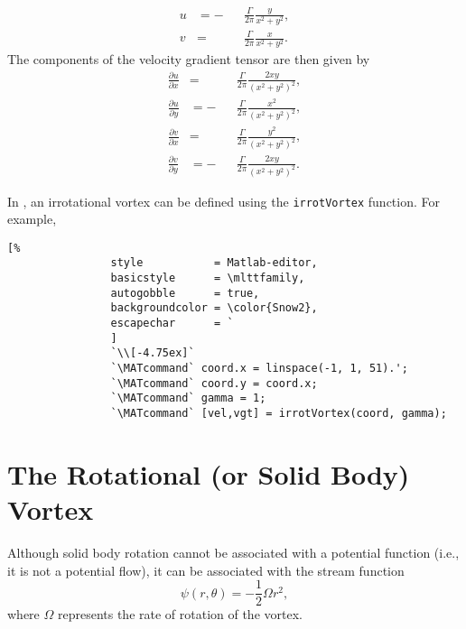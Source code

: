 \documentclass[10pt, twoside]{book}
\begin{document}
			\begin{subequations}
				\label{eq:IrrotVortexVel}
				\begin{alignat}{2}
					u &= -&&\frac{\Gamma}{2\pi}\frac{y}{x^2 + y^2},\label{eq:IrrotVortexVelPolarU}\\
					v &=  &&\frac{\Gamma}{2\pi}\frac{x}{x^2 + y^2}.\label{eq:IrrotVortexVelPolarV}
				\end{alignat}
			\end{subequations}
			The components of the velocity gradient tensor are then given by
			\begin{subequations}
			\label{eq:IrrotVortexVgt}
				\begin{alignat}{2}
					\frac{\partial u}{\partial x} &= &&\frac{\Gamma}{2\pi}\frac{2xy}{\left(x^2 + y^2\right)^2},\label{eq:IrrotVortexVgtUx}\\
					\frac{\partial u}{\partial y} &= -&&\frac{\Gamma}{2\pi}\frac{x^2}{\left(x^2 + y^2\right)^2},\label{eq:IrrotVortexVgtUy}\\
					\frac{\partial v}{\partial x} &= &&\frac{\Gamma}{2\pi}\frac{y^2}{\left(x^2 + y^2\right)^2},\label{eq:IrrotVortexVgtVx}\\
					\frac{\partial v}{\partial y} &= -&&\frac{\Gamma}{2\pi}\frac{2xy}{\left(x^2 + y^2\right)^2}.\label{eq:IrrotVortexVgtVy}
				\end{alignat}
			\end{subequations}
			
			
			In \MATfluids, an irrotational vortex can be defined using the \texttt{irrotVortex} function. For example,
			\begin{lstlisting}[%
				style           = Matlab-editor,
				basicstyle      = \mlttfamily,
				autogobble      = true,
				backgroundcolor = \color{Snow2},
				escapechar      = `
				]
				`\\[-4.75ex]`
				`\MATcommand` coord.x = linspace(-1, 1, 51).';
				`\MATcommand` coord.y = coord.x;
				`\MATcommand` gamma = 1;
				`\MATcommand` [vel,vgt] = irrotVortex(coord, gamma);
			\end{lstlisting}
			
		\section{\label{sec:RotVortex}The Rotational (or Solid Body) Vortex}
			
			Although solid body rotation cannot be associated with a potential function (i.e., it is not a potential flow), it can be associated with the stream function
			\begin{equation}
			\label{eq:RotVortexStreamPol}
				\psi\left(r,\theta\right) = -\frac{1}{2}\Omega r^2,
			\end{equation}
			where $\Omega$ represents the rate of rotation of the vortex.
			
\end{document}
